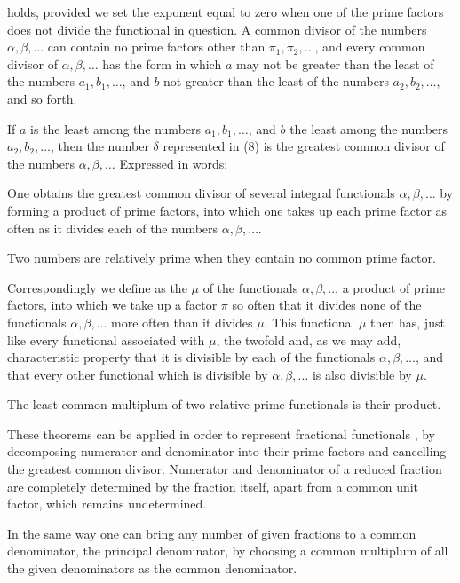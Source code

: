 holds, provided we set the exponent equal to zero when one of the prime factors does not divide the functional in question. A common divisor of the numbers $\alpha, \beta, \ldots$ can contain no prime factors other than $\pi_1, \pi_2, \ldots$, and every common divisor of $\alpha, \beta, \ldots$ has the form
in which $a$ may not be greater than the least of the numbers $a_1, b_1, \ldots$, and $b$ not greater than the least of the numbers $a_2, b_2, \ldots$, and so forth.

If $a$ is the least among the numbers $a_1, b_1, \ldots$, and $b$ the least among the numbers $a_2, b_2, \ldots$, then the number $\delta$ represented in (8) is the greatest common divisor of the numbers $\alpha, \beta, \ldots$ Expressed in words:

One obtains the greatest common divisor of several integral functionals $\alpha, \beta, \ldots$ by forming a product of prime factors, into which one takes up each prime factor as often as it divides each of the numbers $\alpha, \beta, \ldots$.

Two numbers are relatively prime when they contain no common prime factor.

Correspondingly we define as the  $\mu$ of the functionals $\alpha, \beta, \ldots$ a product of prime factors, into which we take up a factor $\pi$ so often that it divides none of the functionals $\alpha, \beta, \ldots$ more often than it divides $\mu$. This functional $\mu$ then has, just like every functional associated with $\mu$, the twofold and, as we may add, characteristic property that it is divisible by each of the functionals $\alpha, \beta, \ldots$, and that every other functional which is divisible by $\alpha, \beta, \ldots$ is also divisible by $\mu$.

The least common multiplum of two relative prime functionals is their product.

These theorems can be applied in order to represent fractional functionals , by decomposing numerator and denominator into their prime factors and cancelling the greatest common divisor. Numerator and denominator of a reduced fraction are completely determined by the fraction itself, apart from a common unit factor, which remains undetermined.

In the same way one can bring any number of given fractions to a common denominator, the principal denominator, by choosing a common multiplum of all the given denominators as the common denominator.
